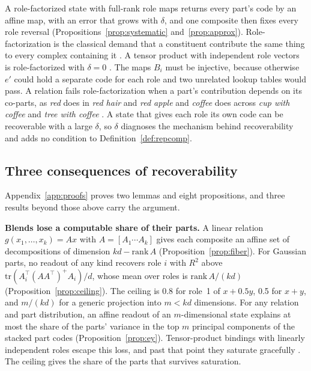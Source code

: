 \documentclass[10pt]{article}
\theoremstyle{plain}
\theoremstyle{remark}
\begin{document}
A role-factorized state with full-rank role maps returns every part's code by an affine map, with an error that grows with $\delta$, and one composite then fixes every role reversal (Propositions~\ref{prop:systematic} and~\ref{prop:approx}). Role-factorization is the classical demand that a constituent contribute the same thing to every complex containing it \citep{fodor1988}. A tensor product with independent role vectors is role-factorized with $\delta = 0$ \citep{smolensky1990}. The maps $B_i$ must be injective, because otherwise $e'$ could hold a separate code for each role and two unrelated lookup tables would pass. A relation fails role-factorization when a part's contribution depends on its co-parts, as \emph{red} does in \emph{red hair} and \emph{red apple} \citep{kamp1995} and \emph{coffee} does across \emph{cup with coffee} and \emph{tree with coffee} \citep{smolensky1988}. A state that gives each role its own code can be recoverable with a large $\delta$, so $\delta$ diagnoses the mechanism behind recoverability and adds no condition to Definition~\ref{def:repcomp}.

\subsection{Three consequences of recoverability}
\label{sec:consequences}

Appendix~\ref{app:proofs} proves two lemmas and eight propositions, and three results beyond those above carry the argument.

\textbf{Blends lose a computable share of their parts.} A linear relation $g(x_1, \ldots, x_k) = A x$ with $A = [A_1 \cdots A_k]$ gives each composite an affine set of decompositions of dimension $kd - \mathrm{rank}\,A$ (Proposition~\ref{prop:fiber}). For Gaussian parts, no readout of any kind recovers role $i$ with $R^2$ above $\mathrm{tr}(A_i^{\top}(AA^{\top})^{+}A_i)/d$, whose mean over roles is $\mathrm{rank}\,A/(kd)$ (Proposition~\ref{prop:ceiling}). The ceiling is 0.8 for role~1 of $x + 0.5y$, 0.5 for $x + y$, and $m/(kd)$ for a generic projection into $m < kd$ dimensions. For any relation and part distribution, an affine readout of an $m$-dimensional state explains at most the share of the parts' variance in the top $m$ principal components of the stacked part codes (Proposition~\ref{prop:ey}). Tensor-product bindings with linearly independent roles escape this loss, and past that point they saturate gracefully \citep{smolensky1990}. The ceiling gives the share of the parts that survives saturation.
\end{document}
